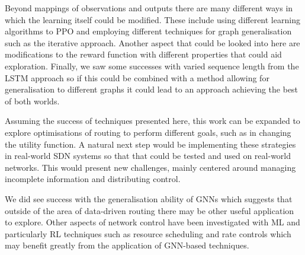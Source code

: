 Beyond mappings of observations and outputs there are many different ways in which the learning itself could be modified. These include using different learning algorithms to PPO and employing different techniques for graph generalisation such as the iterative approach. Another aspect that could be looked into here are modifications to the reward function with different properties that could aid exploration. Finally, we saw some successes with varied sequence length from the LSTM approach so if this could be combined with a method allowing for generalisation to different graphs it could lead to an approach achieving the best of both worlds.

Assuming the success of techniques presented here, this work can be expanded to explore optimisations of routing to perform different goals, such as in changing the utility function. A natural next step would be implementing these strategies in real-world SDN systems so that that could be tested and used on real-world networks. This would present new challenges, mainly centered around managing incomplete information and distributing control.

We did see success with the generalisation ability of GNNs which suggests that outside of the area of data-driven routing there may be other useful application to explore. Other aspects of network control have been investigated with ML and particularly RL techniques such as resource scheduling and rate controls which may benefit greatly from the application of GNN-based techniques.


